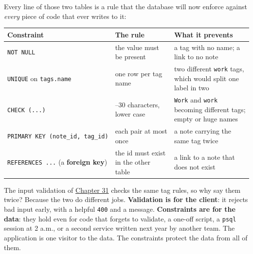 Every line of those two tables is a rule that the database will now enforce against \emph{every} piece of code that ever writes to it:


{\def\LTcaptype{none} %
\begin{longtable}[]{@{}
  >{\raggedright\arraybackslash}p{}
  >{\raggedright\arraybackslash}p{}
  >{\raggedright\arraybackslash}p{}@{}}
\toprule\noalign{}
\begin{minipage}[b]{\linewidth}\raggedright
Constraint
\end{minipage} & \begin{minipage}[b]{\linewidth}\raggedright
The rule
\end{minipage} & \begin{minipage}[b]{\linewidth}\raggedright
What it prevents
\end{minipage} \\
\midrule\noalign{}
\endhead
\bottomrule\noalign{}
\endlastfoot
\texttt{NOT\ NULL} & the value must be present & a tag with no name; a link to no note \\
\texttt{UNIQUE} on \texttt{tags.name} & one row per tag name & two different \texttt{work} tags, which would split one label in two \\
\texttt{CHECK\ (...)} & 1--30 characters, lower case & \texttt{Work} and \texttt{work} becoming different tags; empty or huge names \\
\texttt{PRIMARY\ KEY\ (note\_}\allowbreak{}\texttt{id,}\allowbreak{}\texttt{\ tag\_}\allowbreak{}\texttt{id)} & each pair at most once & a note carrying the same tag twice \\
\texttt{REFERENCES\ ...} (a \textbf{foreign key}) & the id must exist in the other table & a link to a note that does not exist \\
\end{longtable}
}

The input validation of \hyperref[ch:31-input-handling]{Chapter 31} checks the same tag rules, so why say them twice? Because the two do different jobs. \textbf{Validation is for the client}: it rejects bad input early, with a helpful \texttt{400} and a message. \textbf{Constraints are for the data}: they hold even for code that forgets to validate, a one-off script, a \texttt{psql} session at 2 a.m., or a second service written next year by another team. The application is one visitor to the data. The constraints protect the data from all of them.

